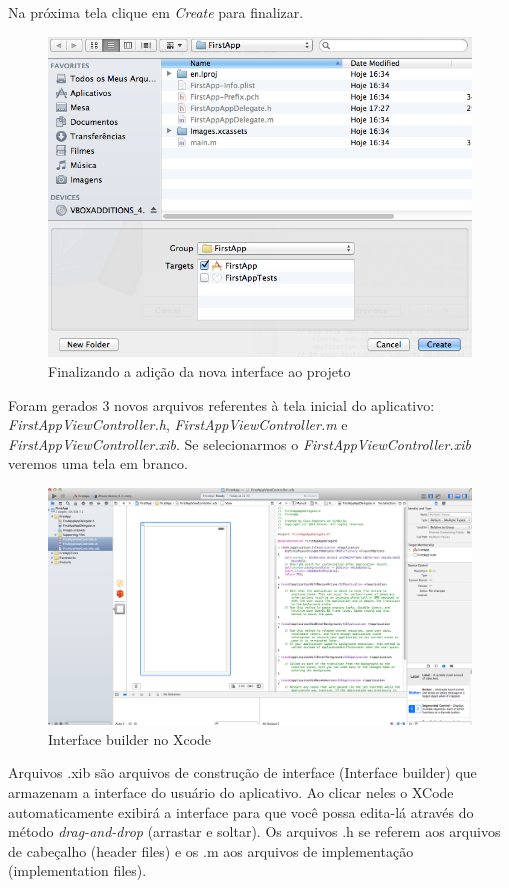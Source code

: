 \documentclass[a4paper,12pt,brazil,doubleside]{book}
\begin{document}
\begin{singlespace}
Na próxima tela clique em \emph{Create} para finalizar.

\begin{figure}[H]
  \centering
  \includegraphics[width=.75\textwidth]{figuras/3/tela_novo_projeto_9.png}
  \caption{Finalizando a adição da nova interface ao projeto}
  \label{fig:a}
\end{figure}


Foram gerados 3 novos arquivos referentes à tela inicial do aplicativo: \emph{FirstAppViewController.h}, \emph{FirstAppViewController.m} e \emph{FirstAppViewController.xib}. Se selecionarmos o \emph{FirstAppViewController.xib} veremos uma tela em branco.

\begin{figure}[H]
  \centering
  \includegraphics[width=.99\textwidth]{figuras/3/tela_novo_projeto_10.png}
  \caption{Interface builder no Xcode}
  \label{fig:a}
\end{figure}


Arquivos .xib são arquivos de construção de interface (Interface builder) que armazenam a interface do usuário do aplicativo. Ao clicar neles o XCode automaticamente exibirá a interface para que você possa edita-lá através do método \emph{drag-and-drop} (arrastar e soltar).
Os arquivos .h se referem aos arquivos de cabeçalho (header files) e os .m aos arquivos de implementação (implementation files).



\end{singlespace}
\end{document}
